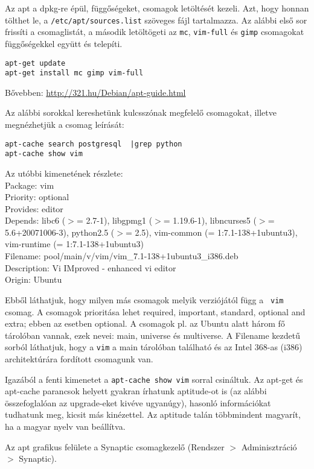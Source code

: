 \documentclass[a4paper]{article}
\newcommand{\code}{\texttt}
\begin{document}
Az apt a dpkg-re épül, függőségeket, csomagok letöltését kezeli.
Azt, hogy honnan tölthet le, a \code{/etc/apt/sources.list} szöveges
fájl tartalmazza. Az alábbi első sor frissíti a csomaglistát, a második
letöltögeti az \code{mc}, \code{vim-full} és \code{gimp} csomagokat
függőségekkel együtt és telepíti.
\begin{Verbatim}
apt-get update
apt-get install mc gimp vim-full
\end{Verbatim}
Bővebben: \url{http://321.hu/Debian/apt-guide.html}

Az alábbi sorokkal kereshetünk kulcsszónak megfelelő csomagokat, illetve
megnézhetjük a csomag leírását:
\begin{Verbatim}
apt-cache search postgresql  |grep python
apt-cache show vim
\end{Verbatim}

Az utóbbi kimenetének részlete:\\
{\small
Package: vim\\
Priority: optional\\
Provides: editor\\
Depends: libc6 ($>$= 2.7-1), libgpmg1 ($>$= 1.19.6-1), libncurses5 ($>$= 5.6+20071006-3), python2.5 ($>$= 2.5), vim-common (= 1:7.1-138+1ubuntu3), vim-runtime (= 1:7.1-138+1ubuntu3)\\
Filename: pool/main/v/vim/vim\_7.1-138+1ubuntu3\_i386.deb\\
Description: Vi IMproved - enhanced vi editor\\
Origin: Ubuntu
} %

Ebből láthatjuk, hogy milyen más csomagok melyik verziójától függ a {\tt
vim} csomag. A csomagok prioritása lehet required, important, standard,
optional and extra; ebben az esetben optional.
A csomagok pl. az Ubuntu alatt három fő tárolóban vannak, ezek nevei:
main, universe és multiverse.
A Filename kezdetű sorból láthatjuk, hogy a {\tt vim} a main tárolóban
található és az Intel 368-as (i386) architektúrára fordított csomagunk van.

Igazából a fenti kimenetet a \code{apt-cache show vim}  sorral
csináltuk. Az apt-get és apt-cache parancsok helyett gyakran írhatunk
aptitude-ot is (az alábbi összefoglalóan az upgrade-eket kivéve ugyanúgy),
hasonló információkat tudhatunk meg, kicsit más kinézettel. Az aptitude
talán többmindent magyarít, ha a magyar nyelv van beállítva.

Az apt grafikus felülete a Synaptic csomagkezelő (Rendszer $>$
Adminisztráció $>$ Synaptic). 
\end{document}
